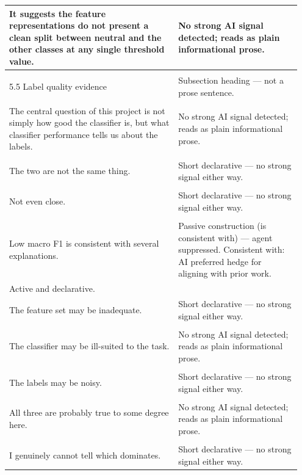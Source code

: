 \documentclass[11pt]{article}
\begin{document}
\begin{longtable}{|p{0.55\linewidth}|p{0.40\linewidth}|}
\hline
It suggests the feature representations do not present a clean split between neutral and the other classes at any single threshold value. & No strong AI signal detected; reads as plain informational prose. \\[2pt]
\hline
\rule{0pt}{3.5cm} & \\
\hline
5.5 Label quality evidence & Subsection heading --- not a prose sentence. \\[2pt]
\hline
\rule{0pt}{3.5cm} & \\
\hline
The central question of this project is not simply how good the classifier is, but what classifier performance tells us about the labels. & No strong AI signal detected; reads as plain informational prose. \\[2pt]
\hline
\rule{0pt}{3.5cm} & \\
\hline
The two are not the same thing. & Short declarative --- no strong signal either way. \\[2pt]
\hline
\rule{0pt}{3.5cm} & \\
\hline
Not even close. & Short declarative --- no strong signal either way. \\[2pt]
\hline
\rule{0pt}{3.5cm} & \\
\hline
Low macro F1 is consistent with several explanations. & Passive construction (is consistent with) --- agent suppressed. Consistent with: AI preferred hedge for aligning with prior work. \\[2pt]
\hline
Active and declarative. & \\
\hline
The feature set may be inadequate. & Short declarative --- no strong signal either way. \\[2pt]
\hline
\rule{0pt}{3.5cm} & \\
\hline
The classifier may be ill-suited to the task. & No strong AI signal detected; reads as plain informational prose. \\[2pt]
\hline
\rule{0pt}{3.5cm} & \\
\hline
The labels may be noisy. & Short declarative --- no strong signal either way. \\[2pt]
\hline
\rule{0pt}{3.5cm} & \\
\hline
All three are probably true to some degree here. & No strong AI signal detected; reads as plain informational prose. \\[2pt]
\hline
\rule{0pt}{3.5cm} & \\
\hline
I genuinely cannot tell which dominates. & Short declarative --- no strong signal either way. \\[2pt]

\end{longtable}
\end{document}
